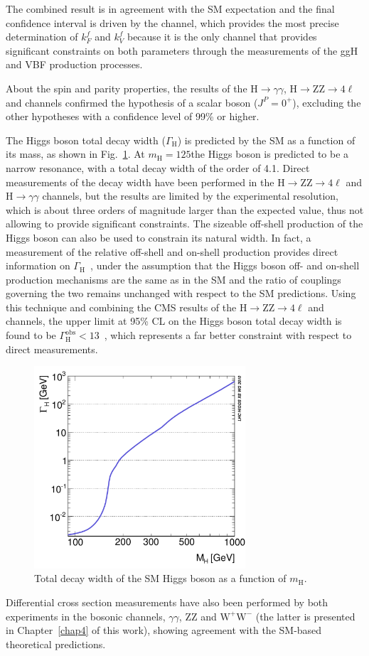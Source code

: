 The combined result is in agreement with the SM expectation and the final confidence interval is driven by the \hww channel, which provides the most precise determination of $k_F^f$ and $k_V^f$ because it is the only channel that provides significant constraints on both parameters through the measurements of the ggH and VBF production processes.

About the spin and parity properties, the results of the H$\to \gamma\gamma$, H$\to$ZZ$\to 4\ell$ and \hwwllnn channels confirmed the hypothesis of a scalar boson ($J^P = 0^+$), excluding the other hypotheses with a confidence level of 99\% or higher.

The Higgs boson total decay width ($\Gamma_\mathrm{H}$) is predicted by the SM as a function of its mass, as shown in Fig.~\ref{fig:width}. At $m_\mathrm{H}=125$\GeV the Higgs boson is predicted to be a narrow resonance, with a total decay width of the order of 4.1\MeV. Direct measurements of the decay width have been performed in the H$\to$ZZ$\to 4\ell$ and H$\to\gamma\gamma$ channels, but the results are limited by the experimental resolution, which is about three orders of magnitude larger than the expected value, thus not allowing to provide significant constraints. The sizeable off-shell production of the Higgs boson can also be used to constrain its natural width. In fact, a measurement of the relative off-shell and on-shell production provides direct information on $\Gamma_\mathrm{H}$~\cite{Caola:2013yja}, under the assumption that the Higgs boson off- and on-shell production mechanisms are the same as in the SM and the ratio of couplings governing the two remains unchanged with respect to the SM predictions. Using this technique and combining the CMS results of the H$\to$ZZ$\to 4\ell$ and \hwwllnn channels, the upper limit at 95\% CL on the Higgs boson total decay width is found to be $\Gamma_\mathrm{H}^\mathrm{obs} < 13$\MeV~\cite{Khachatryan:2016ctc}, which represents a far better constraint with respect to direct measurements.

\begin{figure}[htb]
\centering
\includegraphics[width=0.7\textwidth]{images/width.pdf}
\caption{Total decay width of the SM Higgs boson as a function of $m_\mathrm{H}$.}\label{fig:width}
\end{figure}

Differential cross section measurements have also been performed by both experiments in the bosonic channels, $\gamma\gamma$, ZZ and $\mathrm{W^+W^-}$ (the latter is presented in Chapter~\ref{chap4} of this work), showing agreement with the SM-based theoretical predictions.
